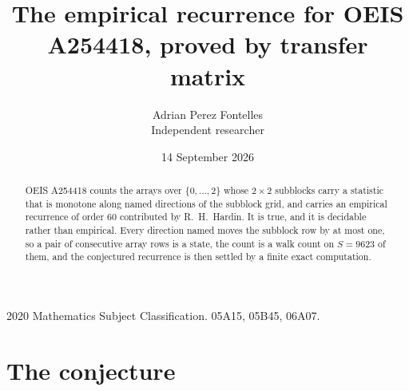 \documentclass[11pt,a4paper]{article}
\title{The empirical recurrence for OEIS A254418, proved by transfer matrix}
\author{Adrian Perez Fontelles\\ \small Independent researcher}
\date{14 September 2026}
\theoremstyle{plain}
\theoremstyle{definition}
\begin{document}
\maketitle

\begin{abstract}
OEIS A254418 counts the arrays over $\{0,\dots,2\}$ whose $2\times2$ subblocks carry a
statistic that is monotone along named directions of the subblock grid, and carries an
empirical recurrence of order $60$ contributed by R.~H.~Hardin. It is true, and it is
decidable rather than empirical. Every direction named moves the subblock row by at most one,
so a pair of consecutive array rows is a state, the count is a walk count on $S=9623$ of them,
and the conjectured recurrence is then settled by a finite exact computation.
\end{abstract}

\noindent\small 2020 Mathematics Subject Classification. 05A15, 05B45, 06A07.\normalsize

\section{The conjecture}
\end{document}
